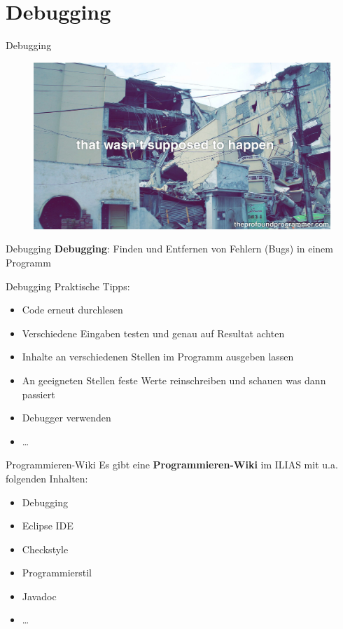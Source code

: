 \documentclass[18pt]{beamer}
\begin{document}
\section{Debugging}

\begin{frame}{Debugging}
    \begin{figure}
        \includegraphics[scale=.15]{img/NG8XW8J8GT.jpg}
    \end{figure}
\end{frame}

\begin{frame}{Debugging}
    \textbf{Debugging}: Finden und Entfernen von Fehlern (Bugs) in einem Programm
\end{frame}

\begin{frame}{Debugging}
    Praktische Tipps:
    \begin{itemize}
        \item Code erneut durchlesen
        \item Verschiedene Eingaben testen und genau auf Resultat achten
        \item Inhalte an verschiedenen Stellen im Programm ausgeben lassen
        \item An geeigneten Stellen feste Werte reinschreiben und schauen was dann passiert
        \item Debugger verwenden
        \item \dots
    \end{itemize}
\end{frame}

\appendix
\beginbackup

\begin{frame}{Programmieren-Wiki}
    Es gibt eine \textbf{Programmieren-Wiki} im ILIAS mit u.a. folgenden Inhalten:

    \begin{itemize}
        \item Debugging
        \item Eclipse IDE
        \item Checkstyle
        \item Programmierstil
        \item Javadoc
        \item \dots
    \end{itemize}
\end{frame}
\end{document}

